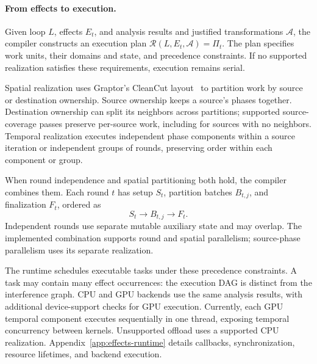 \paragraph{From effects to execution.}
Given loop $L$, effects $E_t$, and analysis results and justified
transformations $\mathcal A$, the compiler constructs an execution plan
$\mathcal R(L,E_t,\mathcal A)=\Pi_t$. The plan specifies work units,
their domains and state, and precedence constraints. If no supported
realization satisfies these requirements, execution remains serial.

Spatial realization uses Graptor's CleanCut
layout~\cite{10.1145/3392717.3392753} to partition work by source or
destination ownership. Source ownership keeps a source's phases
together. Destination ownership can split its neighbors across
partitions; supported source-coverage passes preserve per-source work,
including for sources with no neighbors. Temporal realization executes
independent phase components within a source iteration or independent
groups of rounds, preserving order within each component or group.

When round independence and spatial partitioning both hold, the compiler
combines them. Each round $t$ has setup $S_t$, partition batches
$B_{t,j}$, and finalization $F_t$, ordered as
\[
S_t\longrightarrow B_{t,j}\longrightarrow F_t.
\]
Independent rounds use separate mutable auxiliary state and may overlap.
The implemented combination supports round and spatial parallelism;
source-phase parallelism uses its separate realization.

The runtime schedules executable tasks under these precedence
constraints. A task may contain many effect occurrences: the execution
DAG is distinct from the interference graph. CPU and GPU backends use
the same analysis results, with additional device-support checks for
GPU execution. Currently, each GPU temporal component executes
sequentially in one thread, exposing temporal concurrency between
kernels. Unsupported offload uses a supported CPU realization.
Appendix~\ref{app:effects-runtime} details callbacks, synchronization,
resource lifetimes, and backend execution.
